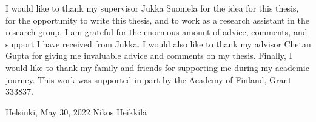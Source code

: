 I would like to thank my supervisor Jukka Suomela for the idea for this thesis, for the opportunity to write this thesis, and to work as a research assistant in the research group.
I am grateful for the enormous amount of advice, comments, and support I have received from Jukka.
I would also like to thank my advisor Chetan Gupta for giving me invaluable advice and comments on my thesis.
Finally, I would like to thank my family and friends for supporting me during my academic journey.
This work was supported in part by the Academy of Finland, Grant 333837.
\vspace{5cm}

Helsinki, May 30, 2022
\vspace{5mm}
{\hfill Nikos Heikkilä \hspace{1cm}}
